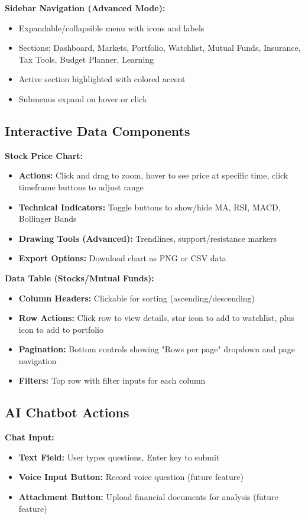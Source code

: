 \documentclass[12pt,a4paper]{report}
\begin{document}
\textbf{Sidebar Navigation (Advanced Mode):}
\begin{itemize}
    \item Expandable/collapsible menu with icons and labels
    \item Sections: Dashboard, Markets, Portfolio, Watchlist, Mutual Funds, Insurance, Tax Tools, Budget Planner, Learning
    \item Active section highlighted with colored accent
    \item Submenus expand on hover or click
\end{itemize}

\subsection{Interactive Data Components}

\textbf{Stock Price Chart:}
\begin{itemize}
    \item \textbf{Actions:} Click and drag to zoom, hover to see price at specific time, click timeframe buttons to adjust range
    \item \textbf{Technical Indicators:} Toggle buttons to show/hide MA, RSI, MACD, Bollinger Bands
    \item \textbf{Drawing Tools (Advanced):} Trendlines, support/resistance markers
    \item \textbf{Export Options:} Download chart as PNG or CSV data
\end{itemize}

\textbf{Data Table (Stocks/Mutual Funds):}
\begin{itemize}
    \item \textbf{Column Headers:} Clickable for sorting (ascending/descending)
    \item \textbf{Row Actions:} Click row to view details, star icon to add to watchlist, plus icon to add to portfolio
    \item \textbf{Pagination:} Bottom controls showing "Rows per page" dropdown and page navigation
    \item \textbf{Filters:} Top row with filter inputs for each column
\end{itemize}

\subsection{AI Chatbot Actions}

\textbf{Chat Input:}
\begin{itemize}
    \item \textbf{Text Field:} User types questions, Enter key to submit
    \item \textbf{Voice Input Button:} Record voice question (future feature)
    \item \textbf{Attachment Button:} Upload financial documents for analysis (future feature)
\end{itemize}
\end{document}
